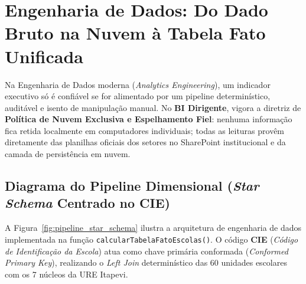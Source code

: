 \documentclass[9pt,a4paper]{extarticle}
\begin{document}
\section{Engenharia de Dados: Do Dado Bruto na Nuvem à Tabela Fato Unificada}

Na Engenharia de Dados moderna (\emph{Analytics Engineering}), um indicador executivo só é confiável se for alimentado por um pipeline determinístico, auditável e isento de manipulação manual. No \textbf{BI Dirigente}, vigora a diretriz de \textbf{Política de Nuvem Exclusiva e Espelhamento Fiel}: nenhuma informação fica retida localmente em computadores individuais; todas as leituras provêm diretamente das planilhas oficiais dos setores no SharePoint institucional e da camada de persistência em nuvem.

\subsection{Diagrama do Pipeline Dimensional (\emph{Star Schema} Centrado no CIE)}

A Figura~\ref{fig:pipeline_star_schema} ilustra a arquitetura de engenharia de dados implementada na função \texttt{calcularTabelaFatoEscolas()}. O código \textbf{CIE} (\emph{Código de Identificação da Escola}) atua como chave primária conformada (\emph{Conformed Primary Key}), realizando o \emph{Left Join} determinístico das 60 unidades escolares com os 7 núcleos da URE Itapevi.
\end{document}
